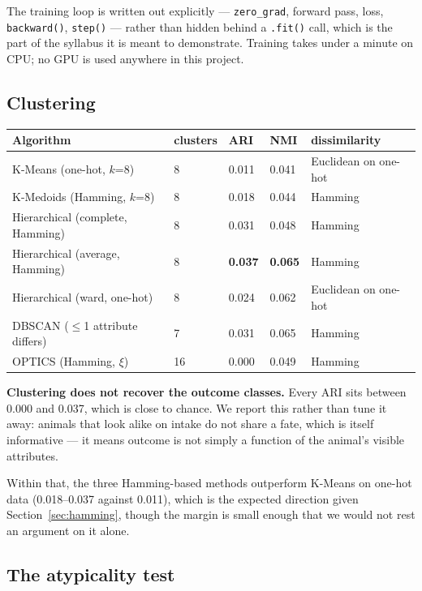 \documentclass[11pt,a4paper]{article}
\begin{document}
The training loop is written out explicitly --- \texttt{zero\_grad},
forward pass, loss, \texttt{backward()}, \texttt{step()} --- rather than hidden
behind a \texttt{.fit()} call, which is the part of the syllabus it is meant to
demonstrate. Training takes under a minute on CPU; no GPU is used anywhere in
this project.

\subsection{Clustering}

\begin{center}
\small
\begin{tabular}{@{}L{6.2cm}R{1.6cm}R{1.5cm}R{1.5cm}L{3.4cm}@{}}
\toprule
\textbf{Algorithm} & \textbf{clusters} & \textbf{ARI} & \textbf{NMI} &
\textbf{dissimilarity} \\
\midrule
K-Means (one-hot, $k$=8)          & 8  & 0.011 & 0.041 & Euclidean on one-hot \\
K-Medoids (Hamming, $k$=8)        & 8  & 0.018 & 0.044 & Hamming \\
Hierarchical (complete, Hamming)  & 8  & 0.031 & 0.048 & Hamming \\
Hierarchical (average, Hamming)   & 8  & \textbf{0.037} & \textbf{0.065} & Hamming \\
Hierarchical (ward, one-hot)      & 8  & 0.024 & 0.062 & Euclidean on one-hot \\
DBSCAN ($\le$1 attribute differs) & 7  & 0.031 & 0.065 & Hamming \\
OPTICS (Hamming, $\xi$)           & 16 & 0.000 & 0.049 & Hamming \\
\bottomrule
\end{tabular}
\end{center}

\textbf{Clustering does not recover the outcome classes.} Every ARI sits between
0.000 and 0.037, which is close to chance. We report this rather than tune it
away: animals that look alike on intake do not share a fate, which is itself
informative --- it means outcome is not simply a function of the animal's
visible attributes.

Within that, the three Hamming-based methods outperform K-Means on one-hot data
(0.018--0.037 against 0.011), which is the expected direction given
Section~\ref{sec:hamming}, though the margin is small enough that we would not
rest an argument on it alone.

\subsection{The atypicality test}
\end{document}
